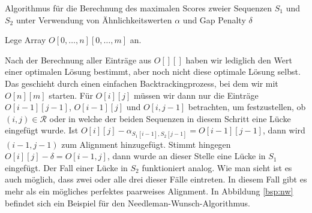 \begin{algorithm}
	\caption{Algorithmus für die Berechnung des maximalen Scores zweier Sequenzen $S_1$ und $S_2$ unter Verwendung von Ähnlichkeitswerten $\alpha$ und Gap Penalty $\delta$}
	\label{alg:opt_nw}
	\begin{algorithmic}[1]
		\State Lege Array $O[0,\dots,n][0,\dots,m]$ an.
		 
		\EndFor
		 
		\EndFor
		\EndFor
		\EndFor
		\EndProcedure
	\end{algorithmic}
\end{algorithm}

Nach der Berechnung aller Einträge aus $O[][]$ haben wir lediglich den Wert einer optimalen Lösung bestimmt, aber noch nicht diese optimale Lösung selbst. Das geschieht durch einen einfachen Backtrackingprozess, bei dem wir mit $O[n][m]$ starten. Für $O[i][j]$ müssen wir dann nur die Einträge $O[i-1][j-1]$, $O[i-1][j]$ und $O[i,j-1]$ betrachten, um festzustellen, ob $(i,j) \in \mathcal{R}$ oder in welche der beiden Sequenzen in diesem Schritt eine Lücke eingefügt wurde. Ist $O[i][j] - \alpha_{S_1[i-1],S_2[j-1]} = O[i-1][j-1]$, dann wird $(i-1,j-1)$ zum Alignment hinzugefügt. Stimmt hingegen $O[i][j] - \delta = O[i-1,j]$, dann wurde an dieser Stelle eine Lücke in $S_1$ eingefügt. Der Fall einer Lücke in $S_2$ funktioniert analog. Wie man sieht ist es auch möglich, dass zwei oder alle drei dieser Fälle eintreten. In diesem Fall gibt es mehr als ein mögliches perfektes paarweises Alignment. In Abbildung \ref{bsp:nw} befindet sich ein Beispiel für den Needleman-Wunsch-Algorithmus.

